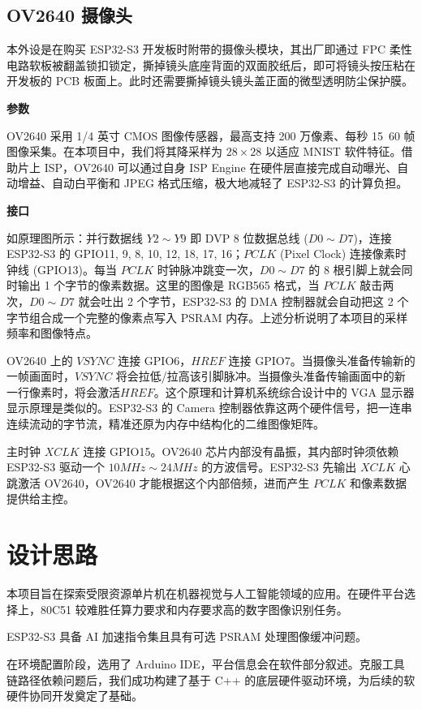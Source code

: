 \documentclass[a4paper,12pt]{ctexart}
\begin{document}
\subsection{OV2640 摄像头}

本外设是在购买 ESP32-S3 开发板时附带的摄像头模块，其出厂即通过 FPC 柔性电路软板被翻盖锁扣锁定，撕掉镜头底座背面的双面胶纸后，即可将镜头按压粘在开发板的 PCB 板面上。此时还需要撕掉镜头镜头盖正面的微型透明防尘保护膜。

\textbf{参数}

OV2640 采用 1/4 英寸 CMOS 图像传感器，最高支持 200 万像素、每秒 15~60 帧图像采集。在本项目中，我们将其降采样为 $28\times28$ 以适应 MNIST 软件特征。借助片上 ISP，OV2640 可以通过自身 ISP Engine 在硬件层直接完成自动曝光、自动增益、自动白平衡和 JPEG 格式压缩，极大地减轻了 ESP32-S3 的计算负担。

\textbf{接口}

如原理图所示：并行数据线 $Y2\sim Y9$ 即 DVP 8 位数据总线 ($D0\sim D7$)，连接 ESP32-S3 的 GPIO11, 9, 8, 10, 12, 18, 17, 16；$PCLK$ (Pixel Clock) 连接像素时钟线 (GPIO13)。每当 $PCLK$ 时钟脉冲跳变一次，$D0\sim D7$ 的 8 根引脚上就会同时输出 1 个字节的像素数据。这里的图像是 RGB565 格式，当 $PCLK$ 敲击两次，$D0\sim D7$ 就会吐出 2 个字节，ESP32-S3 的 DMA 控制器就会自动把这 2 个字节组合成一个完整的像素点写入 PSRAM 内存。上述分析说明了本项目的采样频率和图像特点。

OV2640 上的 $VSYNC$ 连接 GPIO6，$HREF$ 连接 GPIO7。当摄像头准备传输新的一帧画面时，$VSYNC$ 将会拉低/拉高该引脚脉冲。当摄像头准备传输画面中的新一行像素时，将会激活$HREF$。这个原理和计算机系统综合设计中的 VGA 显示器显示原理是类似的。ESP32-S3 的 Camera 控制器依靠这两个硬件信号，把一连串连续流动的字节流，精准还原为内存中结构化的二维图像矩阵。

主时钟 $XCLK$ 连接 GPIO15。OV2640 芯片内部没有晶振，其内部时钟须依赖 ESP32-S3 驱动一个 $10MHz\sim 24MHz$ 的方波信号。ESP32-S3 先输出 $XCLK$ 心跳激活 OV2640，OV2640 才能根据这个内部倍频，进而产生 $PCLK$ 和像素数据提供给主控。

\section{设计思路}

本项目旨在探索受限资源单片机在机器视觉与人工智能领域的应用。在硬件平台选择上，80C51 较难胜任算力要求和内存要求高的数字图像识别任务。

ESP32-S3 具备 AI 加速指令集且具有可选 PSRAM 处理图像缓冲问题。

在环境配置阶段，选用了 Arduino IDE，平台信息会在软件部分叙述。克服工具链路径依赖问题后，我们成功构建了基于 C++ 的底层硬件驱动环境，为后续的软硬件协同开发奠定了基础。
\end{document}
